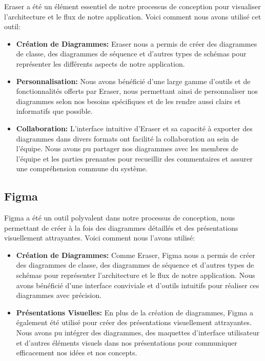 \hspace{16pt}Eraser a été un élément essentiel de notre processus de conception pour visualiser l'architecture et le flux de notre application. Voici comment nous avons utilisé cet outil:

\begin{itemize}
  \item \textbf{Création de Diagrammes: }Eraser nous a permis de créer des diagrammes de classe, des diagrammes de séquence et d'autres types de schémas pour représenter les différents aspects de notre application.
  \item \textbf{Personnalisation: }Nous avons bénéficié d'une large gamme d'outils et de fonctionnalités offerts par Eraser, nous permettant ainsi de personnaliser nos diagrammes selon nos besoins spécifiques et de les rendre aussi clairs et informatifs que possible.
  \item \textbf{Collaboration: }L'interface intuitive d'Eraser et sa capacité à exporter des diagrammes dans divers formats ont facilité la collaboration au sein de l'équipe. Nous avons pu partager nos diagrammes avec les membres de l'équipe et les parties prenantes pour recueillir des commentaires et assurer une compréhension commune du système.
\end{itemize}


\subsection{Figma}

\hspace{16pt}Figma a été un outil polyvalent dans notre processus de conception, nous permettant de créer à la fois des diagrammes détaillés et des présentations visuellement attrayantes. Voici comment nous l'avons utilisé:

\begin{itemize}
  \item \textbf{Création de Diagrammes: }Comme Eraser, Figma nous a permis de créer des diagrammes de classe, des diagrammes de séquence et d'autres types de schémas pour représenter l'architecture et le flux de notre application. Nous avons bénéficié d'une interface conviviale et d'outils intuitifs pour réaliser ces diagrammes avec précision.
  \item \textbf{Présentations Visuelles: }En plus de la création de diagrammes, Figma a également été utilisé pour créer des présentations visuellement attrayantes. Nous avons pu intégrer des diagrammes, des maquettes d'interface utilisateur et d'autres éléments visuels dans nos présentations pour communiquer efficacement nos idées et nos concepts.
\end{itemize}

